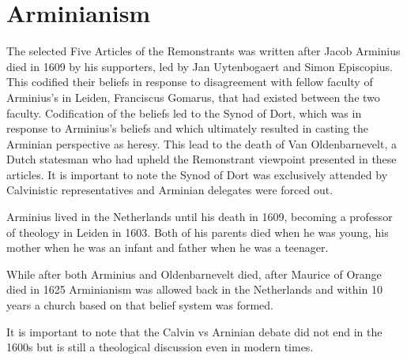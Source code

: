 \documentclass[12pt]{turabian-researchpaper}
\begin{document}
\section{Arminianism}

The selected Five Articles of the Remonstrants was written after Jacob Arminius died in 1609 by his supporters, led by Jan Uytenbogaert and Simon Episcopius.\autocite[pg.256]{woodbridge2013} This codified their beliefs in response to disagreement with fellow faculty of Arminius's in Leiden, Franciscus Gomarus, that had existed between the two faculty. Codification of the beliefs led to the Synod of Dort, which was in response to Arminius's beliefs and which ultimately resulted in casting the Arminian perspective as heresy.\autocite[pg.258]{woodbridge2013} This lead to the death of Van Oldenbarnevelt, a Dutch statesman who had upheld the Remonstrant viewpoint presented in these articles. It is important to note the Synod of Dort was exclusively attended by Calvinistic representatives and Arminian delegates were forced out.

Arminius lived in the Netherlands until his death in 1609, becoming a professor of theology in Leiden in 1603.\autocite[pg.256]{woodbridge2013}  Both of his parents died when he was young, his mother when he was an infant and father when he was a teenager.

While after both Arminius and Oldenbarnevelt died, after Maurice of Orange died in 1625 Arminianism was allowed back in the Netherlands and within 10 years a church based on that belief system was formed.\autocite[pg.258]{woodbridge2013}

It is important to note that the Calvin vs Arninian debate did not end in the 1600s but is still a theological discussion even in modern times.

\newpage
\printbibliography
\end{document}
